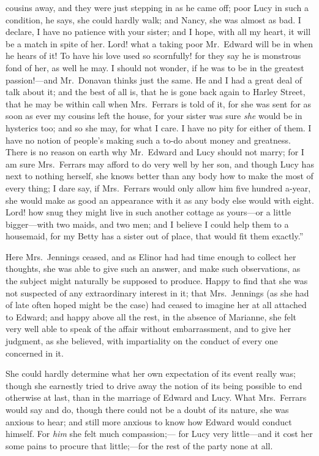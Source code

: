 cousins away, and they were just stepping in as he
came off; poor Lucy in such a condition, he says,
she could hardly walk; and Nancy, she was almost as bad.
I declare, I have no patience with your sister; and I hope,
with all my heart, it will be a match in spite of her.
Lord! what a taking poor Mr.\ Edward will be in when he
hears of it!  To have his love used so scornfully! for
they say he is monstrous fond of her, as well he may.
I should not wonder, if he was to be in the greatest
passion!---and Mr.\ Donavan thinks just the same.  He and I
had a great deal of talk about it; and the best of all is,
that he is gone back again to Harley Street, that he may
be within call when Mrs.\ Ferrars is told of it, for she
was sent for as soon as ever my cousins left the house,
for your sister was sure \emph{she} would be in hysterics too;
and so she may, for what I care.  I have no pity for
either of them.  I have no notion of people's making
such a to-do about money and greatness.  There is no
reason on earth why Mr.\ Edward and Lucy should not marry;
for I am sure Mrs.\ Ferrars may afford to do very well
by her son, and though Lucy has next to nothing herself,
she knows better than any body how to make the most
of every thing; I dare say, if Mrs.\ Ferrars would only
allow him five hundred a-year, she would make as good
an appearance with it as any body else would with eight.
Lord! how snug they might live in such another cottage
as yours---or a little bigger---with two maids, and two men;
and I believe I could help them to a housemaid, for my
Betty has a sister out of place, that would fit them
exactly.''

Here Mrs.\ Jennings ceased, and as Elinor had had
time enough to collect her thoughts, she was able
to give such an answer, and make such observations,
as the subject might naturally be supposed to produce.
Happy to find that she was not suspected of any extraordinary
interest in it; that Mrs.\ Jennings (as she had of late
often hoped might be the case) had ceased to imagine her
at all attached to Edward; and happy above all the rest,
in the absence of Marianne, she felt very well able
to speak of the affair without embarrassment, and to
give her judgment, as she believed, with impartiality
on the conduct of every one concerned in it.

She could hardly determine what her own expectation
of its event really was; though she earnestly tried
to drive away the notion of its being possible to end
otherwise at last, than in the marriage of Edward and Lucy.
What Mrs.\ Ferrars would say and do, though there could
not be a doubt of its nature, she was anxious to hear;
and still more anxious to know how Edward would
conduct himself.  For \emph{him} she felt much compassion;---%
for Lucy very little---and it cost her some pains to procure
that little;---for the rest of the party none at all.

